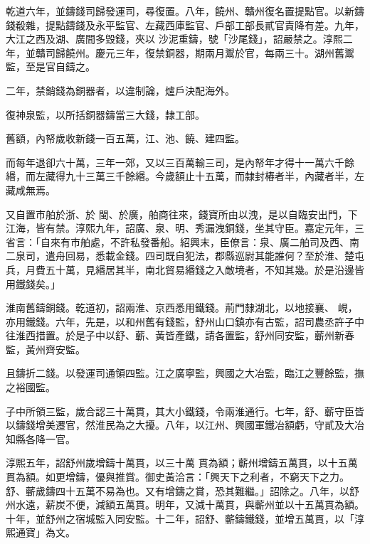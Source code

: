 \begin{pinyinscope}
 乾道六年，並鑄錢司歸發運司，尋復置。八年，饒州、贛州復名置提點官。以新鑄錢殽雜，提點鑄錢及永平監官、左藏西庫監官、戶部工部長貳官責降有差。九年，大江之西及湖、廣間多毀錢，夾以
 沙泥重鑄，號「沙尾錢」，詔嚴禁之。淳熙二年，並贛司歸饒州。慶元三年，復禁銅器，期兩月鬻於官，每兩三十。湖州舊鬻監，至是官自鑄之。



 二年，禁銷錢為銅器者，以違制論，爐戶決配海外。



 復神泉監，以所括銅器鑄當三大錢，隸工部。



 舊額，內帑歲收新錢一百五萬，江、池、饒、建四監。



 而每年退卻六十萬，三年一郊，又以三百萬輸三司，是內帑年才得十一萬六千餘緡，而左藏得九十三萬三千餘緡。今歲額止十五萬，而隸封樁者半，內藏者半，左藏咸無焉。



 又自置市舶於浙、於
 閩、於廣，舶商往來，錢寶所由以洩，是以自臨安出門，下江海，皆有禁。淳熙九年，詔廣、泉、明、秀漏洩銅錢，坐其守臣。嘉定元年，三省言：「自來有市舶處，不許私發番船。紹興末，臣僚言：泉、廣二舶司及西、南二泉司，遣舟回易，悉載金錢。四司既自犯法，郡縣巡尉其能誰何？至於淮、楚屯兵，月費五十萬，見緡居其半，南北貿易緡錢之入敵境者，不知其幾。於是沿邊皆用鐵錢矣。」



 淮南舊鑄銅錢。乾道初，詔兩淮、京西悉用鐵錢。荊門隸湖北，以地接襄、
 峴，亦用鐵錢。六年，先是，以和州舊有錢監，舒州山口鎮亦有古監，詔司農丞許子中往淮西措置。於是子中以舒、蘄、黃皆產鐵，請各置監，舒州同安監，蘄州新春監，黃州齊安監。



 且鑄折二錢。以發運司通領四監。江之廣寧監，興國之大冶監，臨江之豐餘監，撫之裕國監。



 子中所領三監，歲合認三十萬貫，其大小鐵錢，令兩淮通行。七年，舒、蘄守臣皆以鑄錢增美遷官，然淮民為之大擾。八年，以江州、興國軍鐵冶額虧，守貳及大冶知縣各降一官。



 淳熙五年，詔舒州歲增鑄十萬貫，以三十萬
 貫為額；蘄州增鑄五萬貫，以十五萬貫為額。如更增鑄，優與推賞。御史黃洽言：「興天下之利者，不窮天下之力。舒、蘄歲鑄四十五萬不易為也。又有增鑄之賞，恐其難繼。」詔除之。八年，以舒州水遠，薪炭不便，減額五萬貫。明年，又減十萬貫，與蘄州並以十五萬貫為額。十年，並舒州之宿城監入同安監。十二年，詔舒、蘄鑄鐵錢，並增五萬貫，以「淳熙通寶」為文。




\end{pinyinscope}
